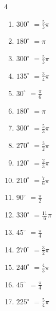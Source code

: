 \begin{multicols}{4}
\begin{enumerate}
  \item $\displaystyle 300^{\circ}$
        $\displaystyle =\frac{5}{3}\pi$

  \item $\displaystyle 180^{\circ}$
        $\displaystyle =\pi$

  \item $\displaystyle 300^{\circ}$
        $\displaystyle =\frac{5}{3}\pi$

  \item $\displaystyle 135^{\circ}$
        $\displaystyle =\frac{3}{4}\pi$

  \item $\displaystyle 30^{\circ}$
        $\displaystyle =\frac{\pi}{6}$

  \item $\displaystyle 180^{\circ}$
        $\displaystyle =\pi$

  \item $\displaystyle 300^{\circ}$
        $\displaystyle =\frac{5}{3}\pi$

  \item $\displaystyle 270^{\circ}$
        $\displaystyle =\frac{3}{2}\pi$

  \item $\displaystyle 120^{\circ}$
        $\displaystyle =\frac{2}{3}\pi$

  \item $\displaystyle 210^{\circ}$
        $\displaystyle =\frac{7}{6}\pi$

  \item $\displaystyle 90^{\circ}$
        $\displaystyle =\frac{\pi}{2}$

  \item $\displaystyle 330^{\circ}$
        $\displaystyle =\frac{11}{6}\pi$

  \item $\displaystyle 45^{\circ}$
        $\displaystyle =\frac{\pi}{4}$

  \item $\displaystyle 270^{\circ}$
        $\displaystyle =\frac{3}{2}\pi$

  \item $\displaystyle 240^{\circ}$
        $\displaystyle =\frac{4}{3}\pi$

\columnbreak %

  \item $\displaystyle 45^{\circ}$
        $\displaystyle =\frac{\pi}{4}$

  \item $\displaystyle 225^{\circ}$
        $\displaystyle =\frac{5}{4}\pi$


\end{enumerate}
\end{multicols}
